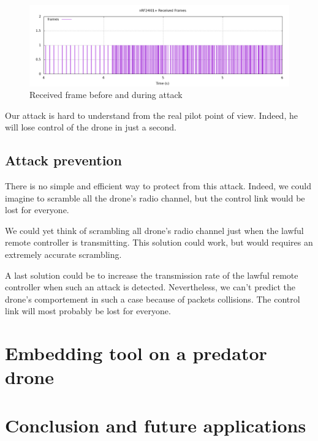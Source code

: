 \documentclass[conference,a4paper]{IEEEtran}
\begin{document}
\begin{figure}[!hb]
  \centering
  \includegraphics[width=\linewidth]{../Rapport/img/gnuplot-trames-emises.png}
  \caption{Received frame before and during attack}%
  \label{fig:syma}
\end{figure}

Our attack is hard to understand from the real pilot point of view. Indeed, he will lose
control of the drone in just a second.

\subsection{Attack prevention}
There is no simple and efficient way to protect from this attack. Indeed, we could imagine
to scramble all the drone's radio channel, but the control link would be lost for
everyone.

We could yet think of scrambling all drone's radio channel just when the lawful remote
controller is transmitting. This solution could work, but would requires an extremely
accurate scrambling.

A last solution could be to increase the transmission rate of the lawful remote controller
when such an attack is detected. Nevertheless, we can't predict the drone's comportement
in such a case because of packets collisions. The control link will most probably be lost
for everyone.



\section{Embedding tool on a predator drone}



\section{Conclusion and future applications}




\end{document}
